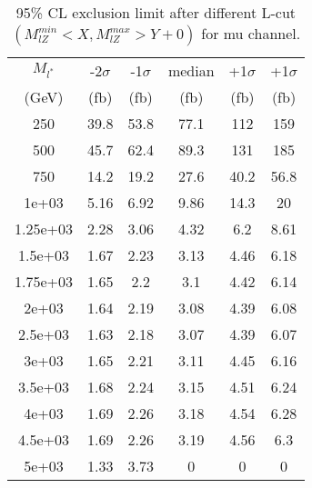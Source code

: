 \documentclass[]{article}
\begin{document}
\begin{table}
\begin{center}
\begin{tabular}{cccccc}
\hline 
\hline 
$M_{l^*}$ & -2$\sigma$ & -1$\sigma$ & median & +1$\sigma$ & +1$\sigma$\\ 
(GeV) & (fb) & (fb) & (fb) & (fb) & (fb)  \\ 
\hline 
\hline 
250 & 39.8 & 53.8 & 77.1 & 112 & 159\\
500 & 45.7 & 62.4 & 89.3 & 131 & 185\\
750 & 14.2 & 19.2 & 27.6 & 40.2 & 56.8\\
1e+03 & 5.16 & 6.92 & 9.86 & 14.3 & 20\\
1.25e+03 & 2.28 & 3.06 & 4.32 & 6.2 & 8.61\\
1.5e+03 & 1.67 & 2.23 & 3.13 & 4.46 & 6.18\\
1.75e+03 & 1.65 & 2.2 & 3.1 & 4.42 & 6.14\\
2e+03 & 1.64 & 2.19 & 3.08 & 4.39 & 6.08\\
2.5e+03 & 1.63 & 2.18 & 3.07 & 4.39 & 6.07\\
3e+03 & 1.65 & 2.21 & 3.11 & 4.45 & 6.16\\
3.5e+03 & 1.68 & 2.24 & 3.15 & 4.51 & 6.24\\
4e+03 & 1.69 & 2.26 & 3.18 & 4.54 & 6.28\\
4.5e+03 & 1.69 & 2.26 & 3.19 & 4.56 & 6.3\\
5e+03 & 1.33 & 3.73 & 0 & 0 & 0\\
\hline 
\end{tabular}
\caption{95\% CL exclusion limit after different L-cut $(M_{lZ}^{min} < X, M_{lZ}^{max} > Y + 0)$ for mu channel.}
\label{tab:limit_muon}
\end{center}
\end{table}
\end{document}
